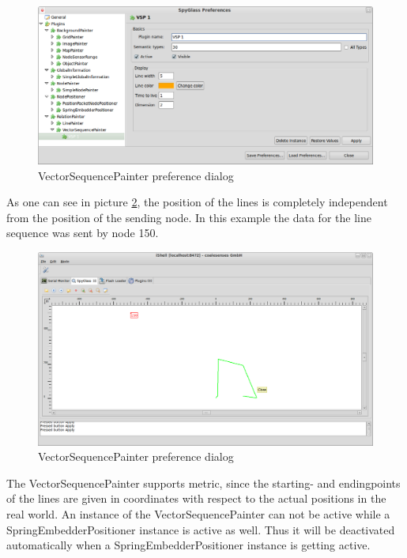 \begin{figure}[htb]
  \begin{center}
    \includegraphics[width=13.2cm]{./pics/vectorsequencepainter_prefpage}
    \caption{VectorSequencePainter preference dialog}
    \label{pic:vsp_preferences}
  \end{center}
\end{figure}

As one can see in picture \ref{pic:vsp}, the position of the lines is completely independent from the position of the
sending node. In this example the data for the line sequence was sent by node 150.

\begin{figure}[htb]
  \begin{center}
    \includegraphics[width=13.2cm]{./pics/vectorsequencepainter}
    \caption{VectorSequencePainter preference dialog}
    \label{pic:vsp}
  \end{center}
\end{figure}

The VectorSequencePainter supports metric, since the starting- and endingpoints of the lines are
given in coordinates with respect to the actual positions in the real world. An instance of the VectorSequencePainter can not
be active while a SpringEmbedderPositioner instance is active as well. Thus it will be deactivated automatically when a
SpringEmbedderPositioner instance is getting active.

